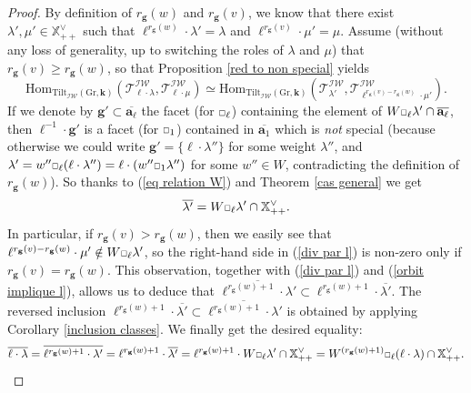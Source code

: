 \documentclass[11pt]{amsart}
\theoremstyle{plain}
\theoremstyle{remark}
\newcommand{\car}{\mbox{\relsize{-5}$\Box$}}
\numberwithin{equation}{section}
\begin{document}
\begin{proof}
		By definition of $r_\mathbf{g}(w)$ and $r_\mathbf{g}(v)$, we know that there exist $\lambda',\mu'\in \mathbb{X}^\vee_{++}$ such that $\ell^{r_\mathbf{g}(w)}\cdot\lambda'=\lambda$ and $\ell^{r_\mathbf{g}(v)}\cdot\mu'=\mu$. Assume (without any loss of generality, up to switching the roles of $\lambda$ and $\mu$) that $r_\mathbf{g}(v)\geq r_\mathbf{g}(w)$, so that Proposition \ref{red to non special} yields
		\begin{equation}\label{div par l}
			\mathrm{Hom}_{\mathrm{Tilt}_\mathcal{IW}(\mathrm{Gr},\mathbf{k})}(\mathscr{T}^\mathcal{IW}_{\ell\cdot\lambda},\mathscr{T}^\mathcal{IW}_{\ell\cdot\mu})\simeq \mathrm{Hom}_{\mathrm{Tilt}_\mathcal{IW}(\mathrm{Gr},\mathbf{k})}(\mathscr{T}^\mathcal{IW}_{\lambda'},\mathscr{T}^\mathcal{IW}_{\ell^{r_\mathbf{g}(v)-r_\mathbf{g}(w)}\cdot\mu'}).
		\end{equation}
		If we denote by $\mathbf{g}'\subset \overline{\mathbf{a}_\ell}$ the facet (for $\car_\ell$) containing the element of $W\car_\ell\lambda'\cap\overline{\mathbf{a}_\ell}$, then $\ell^{-1}\cdot\mathbf{g}'$ is a facet (for $\car_1$) contained in $\overline{\mathbf{a}_1}$ which is \textit{not} special (because otherwise we could write $\mathbf{g}'=\{\ell\cdot\lambda''\}$ for some weight $\lambda''$, and  $\lambda'= w''\car_\ell(\ell\cdot\lambda'')=\ell\cdot( w''\car_1\lambda'')$ for some $w''\in W$, contradicting the definition of $r_\mathbf{g}(w)$). So thanks to (\ref{eq relation W}) and Theorem \ref{cas general} we get 
		$$\overline{\lambda'}=W\car_\ell\lambda'\cap\mathbb{X}^\vee_{++}. $$
		In particular, if $r_\mathbf{g}(v)>r_\mathbf{g}(w)$, then we easily see that $\ell^{r_\mathbf{g}(v)-r_\mathbf{g}(w)}\cdot\mu'\notin W\car_\ell\lambda'$, so the right-hand side in (\ref{div par l}) is non-zero only if $r_\mathbf{g}(v)=r_\mathbf{g}(w)$. This observation, together with (\ref{div par l}) and (\ref{orbit implique l}), allows us to deduce that $\overline{\ell^{r_\mathbf{g}(w)+1}\cdot\lambda'}\subset\ell^{r_\mathbf{g}(w)+1}\cdot\overline{\lambda'}$. The reversed inclusion $\ell^{r_\mathbf{g}(w)+1}\cdot\overline{\lambda'}\subset \overline{\ell^{r_\mathbf{g}(w)+1}\cdot\lambda'}$ is obtained by applying Corollary \ref{inclusion classes}. We finally get the desired equality:
		$$\overline{\ell\cdot\lambda}=\overline{\ell^{r_\mathbf{g}(w)+1}\cdot\lambda'}=\ell^{r_\mathbf{g}(w)+1}\cdot\overline{\lambda'}=\ell^{r_\mathbf{g}(w)+1}\cdot W\car_\ell\lambda'\cap\mathbb{X}^\vee_{++}=W^{(r_\mathbf{g}(w)+1)}\car_\ell (\ell\cdot\lambda)\cap\mathbb{X}^{\vee}_{++}.$$
		

\end{proof}
\end{document}
